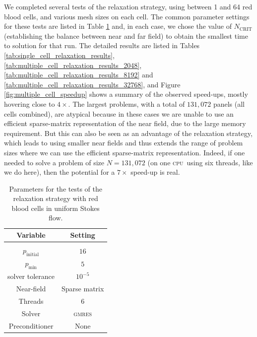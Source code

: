 \documentclass[final,3p,times]{elsarticle}
\newcommand{\cpu}{\textsc{cpu}}
\newcommand{\ncrit}{N_{\text{CRIT}}}
\newcommand{\gmres}{\textsc{gmres}\xspace}
\begin{document}
We completed several tests of the relaxation strategy, using between 1 and 64 red blood cells, and various mesh sizes on each cell. The common parameter settings for these tests are listed in Table \ref{tab:cells_relaxation_settings} and, in each case, we chose the value of $\ncrit$ (establishing the balance between near and far field) to obtain the smallest time to solution for that run. The detailed results are listed in Tables \ref{tab:single_cell_relaxation_results}, \ref{tab:multiple_cell_relaxation_results_2048}, \ref{tab:multiple_cell_relaxation_results_8192} and \ref{tab:multiple_cell_relaxation_results_32768}, and Figure \ref{fig:multiple_cell_speedup} shows a summary of the observed speed-ups, mostly hovering close to $4\times$. The largest problems, with a total of $131,072$ panels (all cells combined), are atypical because in these cases we are unable to use an efficient sparse-matrix representation of the near field, due to the large memory requirement. But this can also be seen as an advantage of the relaxation strategy, which leads to using smaller near fields and thus extends the range of problem sizes where we can use the efficient sparse-matrix representation. Indeed, if one needed to solve a problem of size $N=131,072$ (on one \cpu\ using six threads, like we do here), then the potential for a $7\times$ speed-up is real.

\begin{table}[h]
\footnotesize
\begin{center}
\begin{tabular}{c|c}
 Variable & Setting \\ 
\hline
 & \\
 $p_{\text{initial}}$ & $16$ \\
 $p_{\text{min}}$ &  $5$ \\
 solver tolerance & $10^{-5}$ \\
 Near-field & Sparse matrix \\
 Threads & $6$ \\
 Solver & {\gmres} \\ 
 Preconditioner & None
\end{tabular}
\end{center}
\caption{Parameters for the tests of the relaxation strategy with red blood cells in uniform Stokes flow.}
\label{tab:cells_relaxation_settings}
\end{table}%
\end{document}
